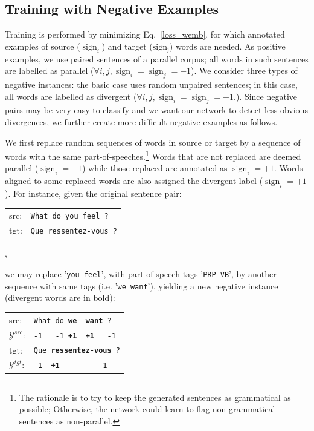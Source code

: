 \documentclass[11pt,a4paper]{article}
\begin{document}
\subsection{Training with Negative Examples}
\label{negative}

Training is performed by minimizing Eq.~\eqref{loss_wemb}, for which annotated examples of source ($\operatorname{sign}_i$) and target ($\operatorname{sign_j}$) words are needed.
As positive examples, we use paired sentences of a parallel corpus; all words in such sentences are labelled as parallel ($ \forall i, j, \operatorname{sign}_i=\operatorname{sign}_j=-1$). %
We consider three types of negative instances: the basic case uses random unpaired sentences; in this case, all words are labelled as divergent ($ \forall i, j, \operatorname{sign}_i=\operatorname{sign}_j=+1.$). %
Since negative pairs may be very easy to classify and we want our network to detect less obvious divergences, we further create more difficult negative examples as follows.

We first replace random sequences of words in source or target by a sequence of words with the same part-of-speeches.\footnote{The rationale is to try to keep the generated sentences as grammatical as possible; 
Otherwise, the network could learn to flag non-grammatical sentences as non-parallel.}
 Words that are not replaced are deemed parallel ($\operatorname{sign}_i=-1$) while those replaced are annotated as $\operatorname{sign}_i=+1$. 
Words aligned to some replaced words are also assigned the divergent label ($\operatorname{sign}_i=+1$). For instance, given the original sentence pair:

\begin{table}[h]
\center
\begin{tabular}{ll}
src: & { \small \texttt{What do you feel ?}} \\
tgt: & { \small \texttt{Que ressentez-vous ?}} \\
\end{tabular},
\end{table}

\noindent we may replace '\texttt{you feel}', with part-of-speech tags '\texttt{PRP VB}', by another sequence with same tags (i.e. '\texttt{we want}'), yielding a new negative instance (divergent words are in bold):  
\begin{table}[h]
\center
\begin{tabular}{ll}
src: & { \small \texttt{What do {\bf we \ want} ?}} \\
$\mathcal{Y}^{src}$: & { \small \texttt{-1 \ \  -1 {\bf +1\ \ +1} \ \  -1}} \\
tgt: & { \small \texttt{Que {\bf ressentez-vous} ?}} \\
$\mathcal{Y}^{tgt}$: & { \small \texttt{-1\ \ {\bf +1}\ \ \ \ \ \ \ \ \ -1}} \\
\end{tabular}
\end{table}
\end{document}
